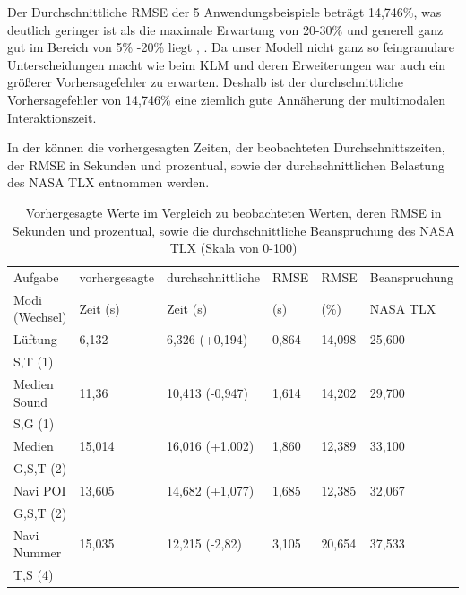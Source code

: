 Der Durchschnittliche RMSE der 5 Anwendungsbeispiele beträgt 14,746\%, was deutlich geringer ist als die maximale Erwartung von 20-30\% \citep{Card_1980} und generell ganz gut im Bereich von 5\% -20\% liegt \citep{Luo_2005}, \citep{Teo:2006}. Da unser Modell nicht ganz so feingranulare Unterscheidungen macht wie beim KLM und deren Erweiterungen war auch ein größerer Vorhersagefehler zu erwarten. Deshalb ist der durchschnittliche Vorhersagefehler von 14,746\% eine ziemlich gute Annäherung der multimodalen Interaktionszeit. 

In der  können die vorhergesagten Zeiten, der beobachteten Durchschnittszeiten, der RMSE in Sekunden und prozentual, sowie der durchschnittlichen Belastung des NASA TLX entnommen werden. 
\begin{table}[ht]
  \centering
		\begin{tabular}{|l|l|l|l|l|l|}
				\hline
				Aufgabe			& vorhergesagte 	& durchschnittliche 	& RMSE	& RMSE 		& Beanspruchung\\
				Modi (Wechsel)	& Zeit (s) 				& Zeit (s)						& (s)		& (\%) 		& NASA TLX 	 \\
				\hline
				Lüftung 			& 6,132						& 6,326 (+0,194)								& 0,864	&	14,098	&	25,600\\
				S,T (1)				&& 						&	&		&	\\
				\hline
				Medien Sound	& 11,36						&	10,413 (-0,947)							& 1,614 &	14,202	&	29,700\\
				S,G (1)				&& 						&	&		&	\\
				\hline
				Medien				& 15,014 					&	16,016 (+1,002)							& 1,860	&	12,389	&	33,100\\	
				G,S,T (2)			&& 						&	&		&	\\
				\hline
				Navi POI			& 13,605					& 14,682 (+1,077)							& 1,685	& 12,385	& 32,067\\
				G,S,T (2)			&& 						&	&		&	\\
				\hline
				Navi Nummer		& 15,035					& 12,215	(-2,82)						& 3,105 & 20,654	& 37,533\\		
				T,S (4)				&& 						&	&		&	\\
				\hline	
			\end{tabular}
	\caption[Vorhergesagte Werte im Vergleich zu beobachteten Werten]{Vorhergesagte Werte im Vergleich zu beobachteten Werten, deren RMSE in Sekunden und prozentual, sowie die durchschnittliche Beanspruchung des NASA TLX (Skala von 0-100)}
	\label{tab:PredictedVsObserved}
\end{table}

